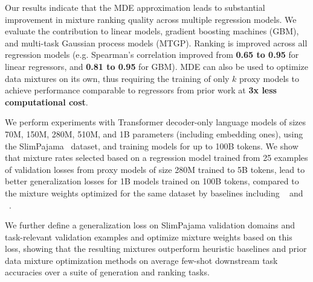 Our results indicate that the MDE approximation leads to substantial improvement in mixture ranking quality across multiple regression models. We evaluate the contribution to linear models, gradient boosting machines (GBM), and multi-task Gaussian process models (MTGP). Ranking is improved across all regression models (e.g. Spearman's correlation improved from \textbf{0.65 to 0.95} for linear regressors, and \textbf{0.81 to 0.95} for GBM). MDE can also be used to optimize data mixtures on its own, thus requiring the training of only $k$ proxy models to achieve performance comparable to regressors from prior work at \textbf{3x less computational cost}.



We perform experiments with Transformer decoder-only language models of sizes 70M, 150M, 280M, 510M, and 1B parameters (including embedding ones), using the SlimPajama~\cite{cerebras2023slimpajama} dataset, and training models for up to 100B tokens. We show that mixture rates selected based on a regression model trained from 25 examples of validation losses from proxy models of size 280M trained to 5B tokens, lead to better generalization losses for 1B models trained on 100B tokens, compared to the mixture weights optimized for the same dataset by baselines including {\doge}~\cite{DOGE} and {\doremi}~\cite{doremi}. 



We further define a generalization loss on SlimPajama validation domains and task-relevant validation examples and optimize mixture weights based on this loss, showing that the resulting mixtures outperform heuristic baselines and prior data mixture optimization methods on average few-shot downstream task accuracies over a suite of generation and ranking tasks.




